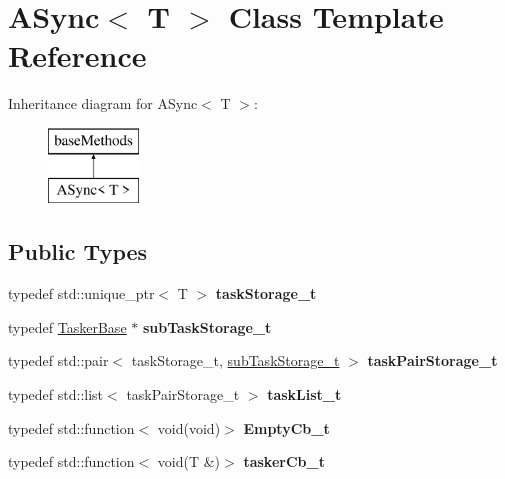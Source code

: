 \hypertarget{class_a_sync}{}\section{A\+Sync$<$ T $>$ Class Template Reference}
\label{class_a_sync}
Inheritance diagram for A\+Sync$<$ T $>$\+:\begin{figure}[H]
\begin{center}
\leavevmode
\includegraphics[height=2.000000cm]{class_a_sync}
\end{center}
\end{figure}
\subsection*{Public Types}
\begin{DoxyCompactItemize}
\item 
\mbox{\label{class_a_sync_ad027c26566d61730f6d924723063a8f8}} 
typedef std\+::unique\+\_\+ptr$<$ T $>$ {\bfseries task\+Storage\+\_\+t}
\item 
\mbox{\label{class_a_sync_ae803791a9b07ed69df45788faf2b1056}} 
typedef \hyperlink{class_tasker_base}{Tasker\+Base} $\ast$ {\bfseries sub\+Task\+Storage\+\_\+t}
\item 
\mbox{\label{class_a_sync_aaf7916c6d943c8411ec46925d90a8980}} 
typedef std\+::pair$<$ task\+Storage\+\_\+t, \hyperlink{class_tasker_base}{sub\+Task\+Storage\+\_\+t} $>$ {\bfseries task\+Pair\+Storage\+\_\+t}
\item 
\mbox{\label{class_a_sync_a29faf063ec9cf599ff7972bd568c8bd6}} 
typedef std\+::list$<$ task\+Pair\+Storage\+\_\+t $>$ {\bfseries task\+List\+\_\+t}
\item 
\mbox{\label{class_a_sync_acf02876cf46228842bf522e2472047fc}} 
typedef std\+::function$<$ void(void)$>$ {\bfseries Empty\+Cb\+\_\+t}
\item 
\mbox{\label{class_a_sync_a89b833f9d18c705542e44c0cf06bd755}} 
typedef std\+::function$<$ void(T \&)$>$ {\bfseries tasker\+Cb\+\_\+t}
\end{DoxyCompactItemize}
